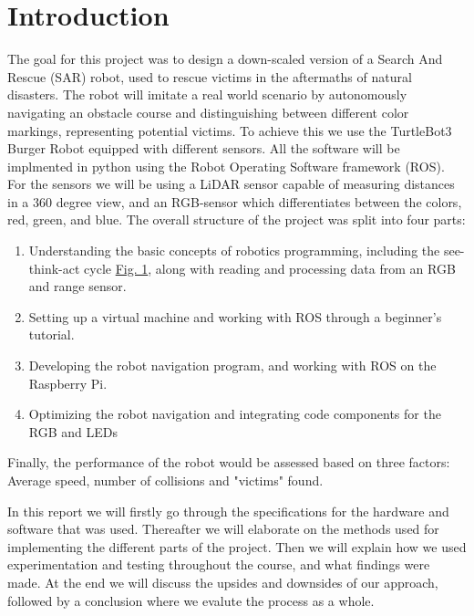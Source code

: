 \documentclass[conference]{IEEEtran}
\begin{document}
\section{Introduction}
The goal for this project was to design a down-scaled version of a Search And Rescue (SAR) robot, used to rescue victims in the aftermaths of natural disasters.
The robot will imitate a real world scenario by autonomously navigating an obstacle course and distinguishing between different color markings, representing potential victims. To achieve this we use the TurtleBot3 Burger Robot equipped with different sensors.
All the software will be implmented in python using the Robot Operating Software framework (ROS). For the sensors we will be using a LiDAR sensor capable of measuring distances in a 360 degree view, and an RGB-sensor which differentiates between the colors, red, green, and blue. 
The overall structure of the project was split into four parts:
\begin{enumerate}
    \item Understanding the basic concepts of robotics programming, including the see-think-act cycle \href{sec:STAC}{Fig. 1}, along with reading and processing data from an RGB and range sensor.
    \item Setting up a virtual machine and working with ROS through a beginner's tutorial.
    \item Developing the robot navigation program, and working with ROS on the Raspberry Pi.
    \item Optimizing the robot navigation and integrating code components for the RGB and LEDs
\end{enumerate} 
Finally, the performance of the robot would be assessed based on three factors: Average speed, number of collisions and "victims" found.

In this report we will firstly go through the specifications for the hardware and software that was used.
Thereafter we will elaborate on the methods used for implementing the different parts of the project.
Then we will explain how we used experimentation and testing throughout the course, and what findings were made.
At the end we will discuss the upsides and downsides of our approach, followed by a conclusion where we evalute the process as a whole.
\end{document}
